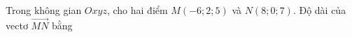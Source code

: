 \begin{ex}
Trong không gian $Oxyz$, cho hai điểm $M(-6;2;5)$ và $N(8;0;7)$. Độ dài của vectơ $\overrightarrow{MN}$ bằng
\end{ex}
